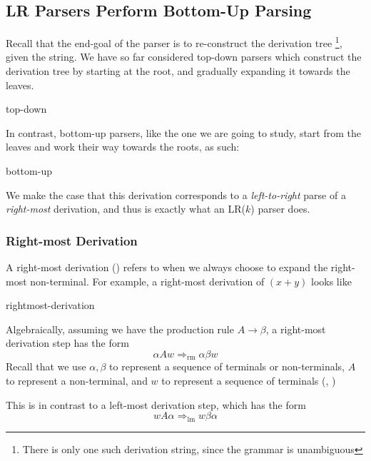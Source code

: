 \subsection{LR Parsers Perform Bottom-Up Parsing}\label{section:bottom-up-parse}
Recall that the end-goal of the parser is to re-construct the derivation tree \footnote{There is only one such derivation string, since the grammar is unambiguous}, given the string. We have so far considered top-down parsers which construct the derivation tree by starting at the root, and gradually expanding it towards the leaves.

\begin{center}
    {top-down}
\end{center}

In contrast, bottom-up parsers, like the one we are going to study, start from the leaves and work their way towards the roots, as such:

\begin{center}
    {bottom-up}
\end{center}

We make the case that this derivation corresponds to a \textit{left-to-right} parse of a \textit{right-most} derivation, and thus is exactly what an LR($k$) parser does.

\subsubsection{Right-most Derivation}
A right-most derivation () refers to when we always choose to expand the right-most non-terminal. For example, a right-most derivation of $(x+y)$ looks like

\begin{center}
    {rightmost-derivation}
\end{center}

Algebraically, assuming we have the production rule $A \to \beta$, a right-most derivation step has the form
\[\alpha A w \Rightarrow_{\text{rm}} \alpha\beta w\]
Recall that we use $\alpha, \beta$ to represent a sequence of terminals or non-terminals, $A$ to represent a non-terminal, and $w$ to represent a sequence of terminals (, )

This is in contrast to a left-most derivation step, which has the form 
\[w A \alpha \Rightarrow_{\text{lm}} w \beta \alpha \]

